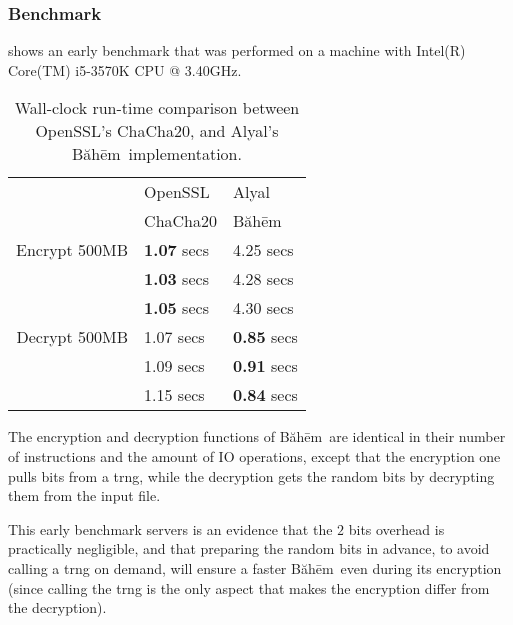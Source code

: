\documentclass[twocolumn]{article}
\newcommand{\baheem}{Băhēm}
\begin{document}
\subsubsection{Benchmark}
 shows an early benchmark that was performed on a
machine with Intel(R) Core(TM) i5-3570K CPU @ 3.40GHz.

\begin{table}[tbh]
    \centering
    \begin{tabular}{rll}
                        & OpenSSL   & Alyal\\
                        & ChaCha20  & \baheem\\\hline
        Encrypt 500MB   & \textbf{1.07} secs & 4.25 secs\\
                        & \textbf{1.03} secs & 4.28 secs\\
                        & \textbf{1.05} secs & 4.30 secs\\\hline
        Decrypt 500MB   & 1.07 secs & \textbf{0.85} secs\\
                        & 1.09 secs & \textbf{0.91} secs\\
                        & 1.15 secs & \textbf{0.84} secs\\
    \end{tabular}
    \caption{Wall-clock run-time comparison between OpenSSL's ChaCha20, and
    Alyal's \baheem\ implementation.}
    \label{tbl_benchmark}
\end{table}

The encryption and decryption functions of \baheem\ are identical in their
number of instructions and the amount of IO operations, except that the
encryption one pulls bits from a \gls{trng}, while the decryption gets the
random bits by decrypting them from the input file.

This early benchmark servers is an evidence that the $2$ bits overhead is
practically negligible, and that preparing the random bits in advance, to
avoid calling a \gls{trng} on demand, will ensure a faster \baheem\ even
during its encryption (since calling the \gls{trng} is the only aspect that
makes the encryption differ from the decryption).
\end{document}
